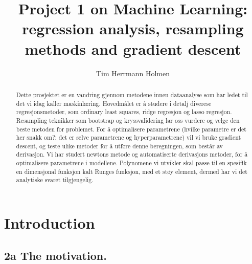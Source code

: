\documentclass[aps,rmp,reprint,amsmath,amssymb,longbibliography]{revtex4-1}
\begin{document}

\title{Project 1 on Machine Learning: regression analysis, resampling methods and gradient descent}

\author{Tim Herrmann Holmen}

\begin{abstract}
    Dette prosjektet er en vandring gjennom metodene innen dataanalyse som har ledet til det vi idag kaller maskinlæring. Hovedmålet er å studere i detalj diverese regresjonsmetoder, som ordinary least squares, ridge regresjon og lasso regresjon. Resampling teknikker som bootstrap og kryssvalidering lar oss vurdere og velge den beste metoden for problemet. For å optimalisere parametrene (hvilke parametre er det her snakk om?: det er selve parametrene og hyperparametrene) vil vi bruke gradient descent, og teste ulike metoder for å utføre denne beregningen, som består av derivasjon. Vi har studert newtons metode og automatiserte derivasjons metoder, for å optimalisere parametrene i modellene. Polynomene vi utvikler skal passe til en spesifik en dimensjonal funksjon kalt Runges funksjon, med et støy element, dermed har vi det analytiske svaret tilgjengelig.
\end{abstract}

\maketitle

\tableofcontents

\section{Introduction}
\subsection{2a The motivation.}
\end{document}
